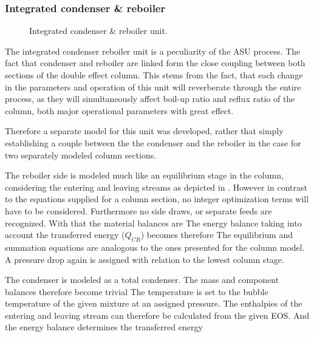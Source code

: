     \subsubsection{Integrated condenser \& reboiler}
    \label{sec:mathpro:steady:conreb}
        \begin{figure}
            \center
            
            \caption{Integrated condenser \& reboiler unit.}
            \label{fig:mathpro:conreb_ss}
        \end{figure}

        The integrated condenser reboiler unit is a peculiarity of the ASU process. The fact that condenser and
        reboiler are linked form the close coupling between both sections of the double effect column.
        This stems from the fact, that each change in the parameters and operation of this unit will reverberate
        through the entire process, as they will simultaneously affect boil-up ratio and reflux
        ratio of the column, both major operational parameters with great effect.

        Therefore a separate model for this unit was developed, rather that simply establishing a couple between the
        the condenser and the reboiler in the case for two separately modeled column sections.

        The reboiler side is modeled much like an equilibrium stage in the column, considering the entering
        and leaving streams as depicted in . However in contrast to the
        equations supplied for a column section, no integer optimization terms will have to be considered.
        Furthermore no side draws, or separate feeds are recognized. With that the material balances are
        The energy balance taking into account the transferred energy ($Q_{CR}$) becomes therefore
        The equilibrium and summation equations are analogous to the ones presented for the column model.
        A pressure drop again is assigned with relation to the lowest column stage.

        The condenser is modeled as a total condenser. The mass and component balances therefore become trivial
        The temperature is set to the bubble temperature of the given mixture at an assigned pressure. The
        enthalpies of the entering and leaving stream can therefore be calculated from the given EOS. And
        the energy balance determines the transferred energy
